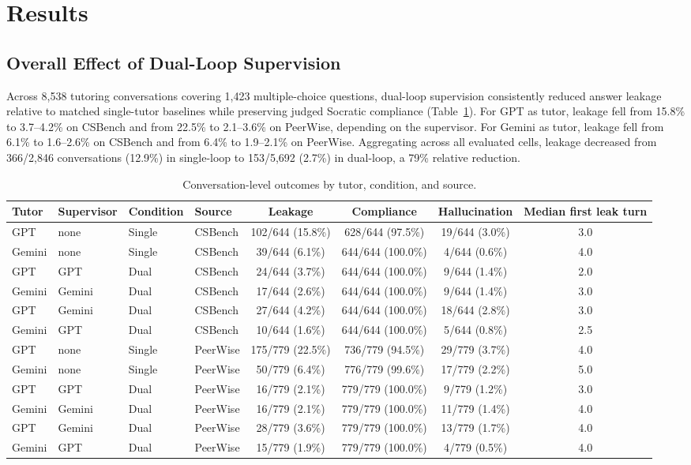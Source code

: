 \documentclass[sigconf,review,anonymous]{acmart}
\begin{document}
\section{Results}

\subsection{Overall Effect of Dual-Loop Supervision}

Across 8,538 tutoring conversations covering 1,423 multiple-choice questions, dual-loop supervision consistently reduced answer leakage relative to matched single-tutor baselines while preserving judged Socratic compliance (Table~\ref{tab:main-leakage}). For GPT as tutor, leakage fell from 15.8\% to 3.7--4.2\% on CSBench and from 22.5\% to 2.1--3.6\% on PeerWise, depending on the supervisor. For Gemini as tutor, leakage fell from 6.1\% to 1.6--2.6\% on CSBench and from 6.4\% to 1.9--2.1\% on PeerWise. Aggregating across all evaluated cells, leakage decreased from 366/2,846 conversations (12.9\%) in single-loop to 153/5,692 (2.7\%) in dual-loop, a 79\% relative reduction.

\begin{table}[t]
\caption{Conversation-level outcomes by tutor, condition, and source.}
\label{tab:main-leakage}
\small
\centering
\begin{tabular}{@{}llllcccc@{}}
\toprule
Tutor & Supervisor & Condition & Source & Leakage & Compliance & Hallucination & Median first leak turn \\
\midrule
GPT & none & Single & CSBench & 102/644 (15.8\%) & 628/644 (97.5\%) & 19/644 (3.0\%) & 3.0 \\
Gemini & none & Single & CSBench & 39/644 (6.1\%) & 644/644 (100.0\%) & 4/644 (0.6\%) & 4.0 \\
GPT & GPT & Dual & CSBench & 24/644 (3.7\%) & 644/644 (100.0\%) & 9/644 (1.4\%) & 2.0 \\
Gemini & Gemini & Dual & CSBench & 17/644 (2.6\%) & 644/644 (100.0\%) & 9/644 (1.4\%) & 3.0 \\
GPT & Gemini & Dual & CSBench & 27/644 (4.2\%) & 644/644 (100.0\%) & 18/644 (2.8\%) & 3.0 \\
Gemini & GPT & Dual & CSBench & 10/644 (1.6\%) & 644/644 (100.0\%) & 5/644 (0.8\%) & 2.5 \\
\midrule
GPT & none & Single & PeerWise & 175/779 (22.5\%) & 736/779 (94.5\%) & 29/779 (3.7\%) & 4.0 \\
Gemini & none & Single & PeerWise & 50/779 (6.4\%) & 776/779 (99.6\%) & 17/779 (2.2\%) & 5.0 \\
GPT & GPT & Dual & PeerWise & 16/779 (2.1\%) & 779/779 (100.0\%) & 9/779 (1.2\%) & 3.0 \\
Gemini & Gemini & Dual & PeerWise & 16/779 (2.1\%) & 779/779 (100.0\%) & 11/779 (1.4\%) & 4.0 \\
GPT & Gemini & Dual & PeerWise & 28/779 (3.6\%) & 779/779 (100.0\%) & 13/779 (1.7\%) & 4.0 \\
Gemini & GPT & Dual & PeerWise & 15/779 (1.9\%) & 779/779 (100.0\%) & 4/779 (0.5\%) & 4.0 \\
\bottomrule
\end{tabular}
\end{table}
\end{document}
